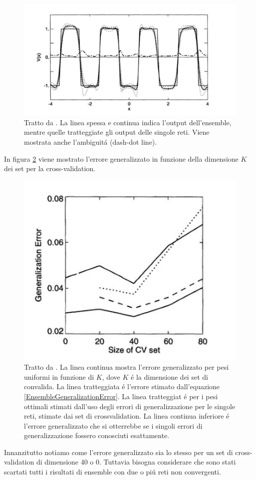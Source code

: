 \documentclass[a4paper,12pt]{report}
\begin{document}
  \begin{figure}[h!]
   \centering
   \includegraphics[scale=0.4]{SqWave.png}
   \caption{Tratto da \cite{krogh1995neural}. La linea spessa e continua indica l'output dell'ensemble, mentre quelle tratteggiate gli output delle singole reti. Viene mostrata anche l'ambiguit\'a (dash-dot line).}
   \label{SqWavepng}
  \end{figure}
  In figura \ref{GenErrorpng} viene mostrato l'errore generalizzato in funzione della dimensione $K$ dei set per la cross-validation.
  \begin{figure}[h!]
   \centering
   \includegraphics[scale=0.4]{GenError.png} 
   \caption{Tratto da \cite{krogh1995neural}. La linea continua mostra l'errore generalizzato per pesi uniformi in funzione di $K$, dove $K$ \'e la dimensione dei set di convalida. La linea tratteggiata \'e l'errore stimato dall'equazione \ref{EnsembleGeneralizationError}. La linea tratteggiat \'e per i pesi ottimali stimati dall'uso degli errori di generalizzazione per le singole reti, stimate dai set di crossvalidation. La linea continua inferiore \'e l'errore generalizzato che si otterrebbe se i singoli errori di generalizzazione fossero conosciuti esattamente.}
   \label{GenErrorpng}
  \end{figure}
  Innanzitutto notiamo come l'errore generalizzato sia lo stesso per un set di cross-validation di dimensione 40 o 0. 
  Tuttavia bisogna considerare che sono stati scartati tutti i risultati di ensemble con due o pi\'u reti non convergenti.
\end{document}
